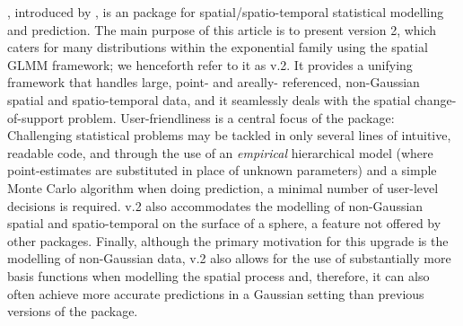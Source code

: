 \documentclass[nojss]{jss}
\begin{document}
 , introduced by \cite{FRK_paper}, is an  %
 package for spatial/spatio-temporal statistical modelling and prediction. 
 The main purpose of this article is to present version 2, which caters for many distributions within the exponential family using the spatial GLMM framework; we henceforth refer to it as  v.2. 
 It provides a unifying framework that handles large, point- and areally- referenced, non-Gaussian spatial and spatio-temporal data, and it seamlessly deals with the spatial change-of-support problem. %
  User-friendliness is a central focus of the package: Challenging statistical problems may be tackled in only several lines of intuitive, readable code, and through the use of an \textit{empirical} hierarchical model (where point-estimates are substituted in place of unknown parameters) and a simple Monte Carlo algorithm when doing prediction, a minimal number of user-level decisions is required.
  v.2 also accommodates the modelling of non-Gaussian spatial and spatio-temporal on the surface of a sphere, a feature not offered by other packages. 
 Finally, although the primary motivation for this upgrade is the modelling of non-Gaussian data,  v.2 also allows for the use of substantially more basis functions when modelling the spatial process and, therefore, it can also often achieve more accurate predictions in a Gaussian setting than previous versions of the package. 
\end{document}
